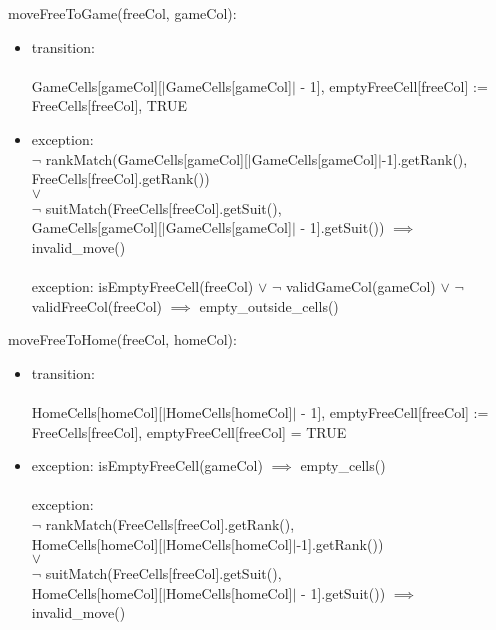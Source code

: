 \documentclass[12pt]{article}
\begin{document}
\noindent moveFreeToGame(freeCol, gameCol):
\begin{itemize}
\item transition: \\\\GameCells[gameCol][$|$GameCells[gameCol]$|$ - 1], emptyFreeCell[freeCol] :=\\ FreeCells[freeCol], TRUE
\item exception:\\ $\lnot$ rankMatch(GameCells[gameCol][$|$GameCells[gameCol]$|$-1].getRank(),\\ FreeCells[freeCol].getRank())
\\ $\vee$ \\
$\lnot$ suitMatch(FreeCells[freeCol].getSuit(),\\ GameCells[gameCol][$|$GameCells[gameCol]$|$ - 1].getSuit()) $\implies$ invalid\_move()\\\\

exception:    isEmptyFreeCell(freeCol) $\vee$ $\lnot$ validGameCol(gameCol)  $\vee$ $\lnot$ validFreeCol(freeCol) $\implies$ empty\_outside\_cells() \\

\end{itemize}


\noindent moveFreeToHome(freeCol, homeCol):
\begin{itemize}
\item transition:\\\\ HomeCells[homeCol][$|$HomeCells[homeCol]$|$ - 1], emptyFreeCell[freeCol] :=  \\FreeCells[freeCol],  emptyFreeCell[freeCol] = TRUE
\item exception: isEmptyFreeCell(gameCol) $\implies$ empty\_cells() \\\\
exception: \\ $\lnot$ rankMatch(FreeCells[freeCol].getRank(), \\HomeCells[homeCol][$|$HomeCells[homeCol]$|$-1].getRank())
\\ $\vee$ \\
$\lnot$ suitMatch(FreeCells[freeCol].getSuit(),\\HomeCells[homeCol][$|$HomeCells[homeCol]$|$ - 1].getSuit()) $\implies$ invalid\_move()\\\\
\end{itemize}
\end{document}
